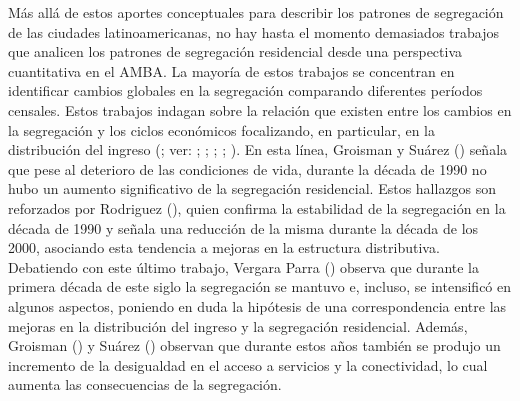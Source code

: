 \documentclass[
  spanish,
  a4paper,%
  chapterprefix=true,%
  DIV=calc,%
  twoside]{scrbook}%
\begin{document}
Más allá de estos aportes conceptuales para describir los patrones de
segregación de las ciudades latinoamericanas, no hay hasta el momento
demasiados trabajos que analicen los patrones de segregación residencial
desde una perspectiva cuantitativa en el AMBA. La mayoría de estos
trabajos se concentran en identificar cambios globales en la segregación
comparando diferentes períodos censales. Estos trabajos indagan sobre la
relación que existen entre los cambios en la segregación y los ciclos
económicos focalizando, en particular, en la distribución del ingreso
(; ver: ; ; ; ; ). En esta línea, Groisman y Suárez () señala que
pese al deterioro de las condiciones de vida, durante la década de 1990
no hubo un aumento significativo de la segregación residencial. Estos
hallazgos son reforzados por Rodriguez (), quien confirma la
estabilidad de la segregación en la década de 1990 y señala una
reducción de la misma durante la década de los 2000, asociando esta
tendencia a mejoras en la estructura distributiva. Debatiendo con este
último trabajo, Vergara Parra () observa que durante la primera década
de este siglo la segregación se mantuvo e, incluso, se intensificó en
algunos aspectos, poniendo en duda la hipótesis de una correspondencia
entre las mejoras en la distribución del ingreso y la segregación
residencial. Además, Groisman () y Suárez () observan que durante
estos años también se produjo un incremento de la desigualdad en el
acceso a servicios y la conectividad, lo cual aumenta las consecuencias
de la segregación.
\end{document}
